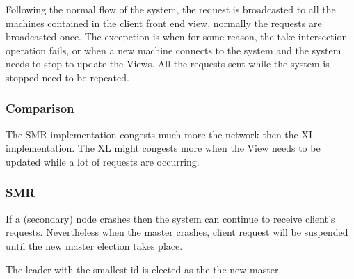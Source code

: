 \documentclass[times, 10pt,twocolumn]{article}
\begin{document}

Following the normal flow of the system, the request is broadcasted to all the machines contained in the client front end view, normally the requests
are broadcasted once. The excepetion is when for some reason, the take intersection operation fails, or when a new machine connects to the system and 
the system needs to stop to update the Views. All the requests sent while the system is stopped need to be repeated.

\subsubsection{Comparison}


The SMR implementation congests much more the network then the XL implementation. The XL might congests more when the View needs to be updated while
a lot of requests are occurring.

\subsubsection{SMR}


If a (secondary) node crashes then the system can continue to receive client's requests. Nevertheless when the master crashes, client request will be
suspended until the new master election takes place.

The leader with the smallest id is elected as the the new master.
\end{document}
